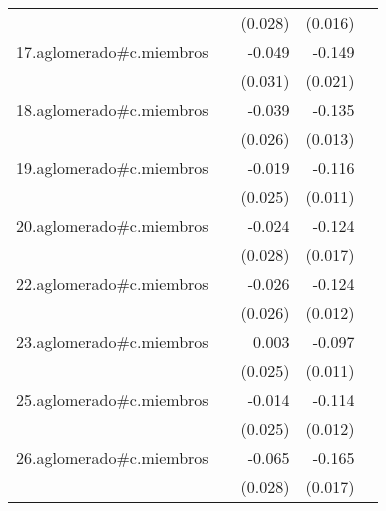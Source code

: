 {\begin{longtable}{l*{4}{D{.}{.}{-1}}}
            &                     &     (0.028)         &     (0.016)         &                     \\
\addlinespace
17.aglomerado#c.miembros&                     &      -0.049         &      -0.149\sym{***}&                     \\
            &                     &     (0.031)         &     (0.021)         &                     \\
\addlinespace
18.aglomerado#c.miembros&                     &      -0.039         &      -0.135\sym{***}&                     \\
            &                     &     (0.026)         &     (0.013)         &                     \\
\addlinespace
19.aglomerado#c.miembros&                     &      -0.019         &      -0.116\sym{***}&                     \\
            &                     &     (0.025)         &     (0.011)         &                     \\
\addlinespace
20.aglomerado#c.miembros&                     &      -0.024         &      -0.124\sym{***}&                     \\
            &                     &     (0.028)         &     (0.017)         &                     \\
\addlinespace
22.aglomerado#c.miembros&                     &      -0.026         &      -0.124\sym{***}&                     \\
            &                     &     (0.026)         &     (0.012)         &                     \\
\addlinespace
23.aglomerado#c.miembros&                     &       0.003         &      -0.097\sym{***}&                     \\
            &                     &     (0.025)         &     (0.011)         &                     \\
\addlinespace
25.aglomerado#c.miembros&                     &      -0.014         &      -0.114\sym{***}&                     \\
            &                     &     (0.025)         &     (0.012)         &                     \\
\addlinespace
26.aglomerado#c.miembros&                     &      -0.065\sym{*}  &      -0.165\sym{***}&                     \\
            &                     &     (0.028)         &     (0.017)         &                     \\

\end{longtable}}

